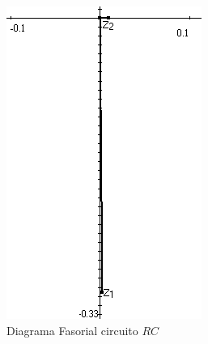 \documentclass[twocolumn]{IEEEtran}
\begin{document}
\begin{figure}[H]
	\centering
		\includegraphics[scale=0.45]{fa2.png}
	\caption{Diagrama Fasorial circuito $RC$}
	\label{fig7}
\end{figure}
\end{document}
